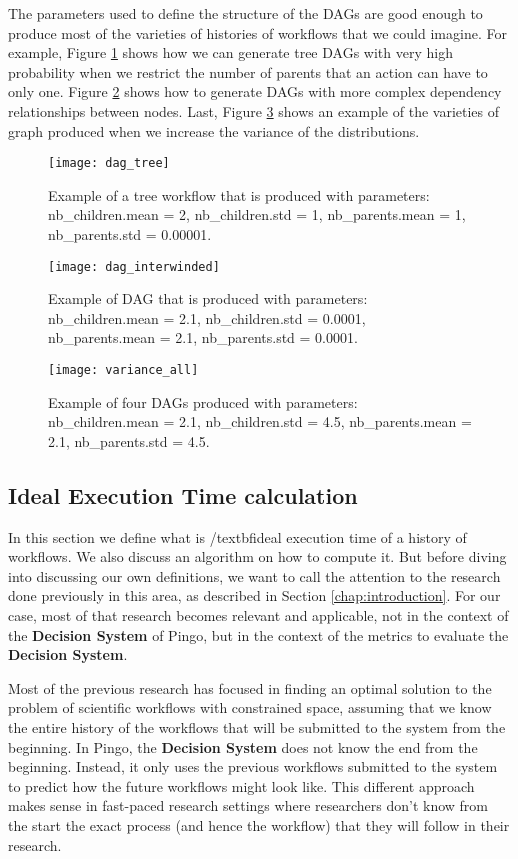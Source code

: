 The parameters used to define the structure of the DAGs are good enough to produce most of the varieties of histories of workflows that we could imagine. For example, Figure \ref{fig:dag_tree} shows how we can generate tree DAGs with very high probability when we restrict the number of parents that an action can have to only one.  Figure \ref{fig:dag_complex} shows how to generate DAGs with more complex dependency relationships between nodes.  Last, Figure \ref{fig:dag_variety} shows an example of the varieties of graph produced when we increase the variance of the distributions.
\begin{figure}
\centering
\texttt{[image: dag\_tree]}
\caption{Example of a tree workflow that is produced with parameters: nb\_children.mean = 2, nb\_children.std =  1, nb\_parents.mean = 1, nb\_parents.std = 0.00001.}
\label{fig:dag_tree}
\end{figure}
\begin{figure}
\centering
\texttt{[image: dag\_interwinded]}
\caption{Example of DAG that is produced with parameters: nb\_children.mean = 2.1, nb\_children.std = 0.0001, nb\_parents.mean = 2.1, nb\_parents.std = 0.0001.}
\label{fig:dag_complex}
\end{figure}

\begin{figure}
\centering
\texttt{[image: variance\_all]}
\caption{Example of four DAGs produced with parameters: nb\_children.mean = 2.1, nb\_children.std = 4.5, nb\_parents.mean = 2.1, nb\_parents.std = 4.5.}
\label{fig:dag_variety}
\end{figure}


\subsection{Ideal Execution Time calculation}
In this section we define what is /textbf{ideal execution time of a history of workflows}. We also discuss an algorithm on how to compute it.  But before diving into discussing our own definitions, we want to call the attention to the research done previously in this area, as described in Section \ref{chap:introduction}.  For our case, most of that research becomes relevant and applicable, not in the context of the \textbf{Decision System} of Pingo, but in the context of the metrics to evaluate the \textbf{Decision System}.  

Most of the previous research has focused in finding an optimal solution to the problem of scientific workflows with constrained space, assuming that we know the entire history of the workflows that will be submitted to the system from the beginning.  In Pingo, the \textbf{Decision System} does not know the end from the beginning.  Instead, it only uses the previous workflows submitted to the system to predict how the future workflows might look like.  This different approach makes sense in fast-paced research settings where researchers don't know from the start the exact process (and hence the workflow) that they will follow in their research.

